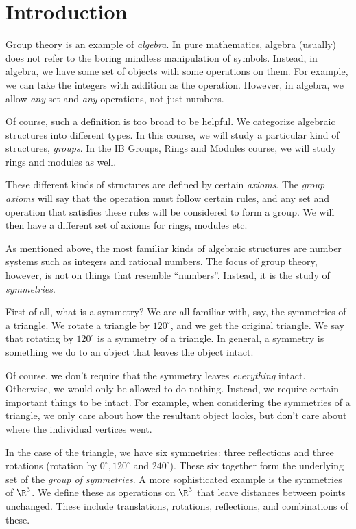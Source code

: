 \documentclass[a4paper]{article}
\begin{document}
\setcounter{section}{-1}
\section{Introduction}
Group theory is an example of \emph{algebra}. In pure mathematics, algebra (usually) does not refer to the boring mindless manipulation of symbols. Instead, in algebra, we have some set of objects with some operations on them. For example, we can take the integers with addition as the operation. However, in algebra, we allow \emph{any} set and \emph{any} operations, not just numbers.

Of course, such a definition is too broad to be helpful. We categorize algebraic structures into different types. In this course, we will study a particular kind of structures, \emph{groups}. In the IB Groups, Rings and Modules course, we will study rings and modules as well.

These different kinds of structures are defined by certain \emph{axioms}. The \emph{group axioms} will say that the operation must follow certain rules, and any set and operation that satisfies these rules will be considered to form a group. We will then have a different set of axioms for rings, modules etc.

As mentioned above, the most familiar kinds of algebraic structures are number systems such as integers and rational numbers. The focus of group theory, however, is not on things that resemble ``numbers''. Instead, it is the study of \emph{symmetries}.

First of all, what is a symmetry? We are all familiar with, say, the symmetries of a triangle. We rotate a triangle by $120^\circ$, and we get the original triangle. We say that rotating by $120^\circ$ is a symmetry of a triangle. In general, a symmetry is something we do to an object that leaves the object intact.

Of course, we don't require that the symmetry leaves \emph{everything} intact. Otherwise, we would only be allowed to do nothing. Instead, we require certain important things to be intact. For example, when considering the symmetries of a triangle, we only care about how the resultant object looks, but don't care about where the individual vertices went.

In the case of the triangle, we have six symmetries: three reflections and three rotations (rotation by $0^\circ, 120^\circ$ and $240^\circ$). These six together form the underlying set of the \emph{group of symmetries}. A more sophisticated example is the symmetries of $\R^3$. We define these as operations on $\R^3$ that leave distances between points unchanged. These include translations, rotations, reflections, and combinations of these.
\end{document}
